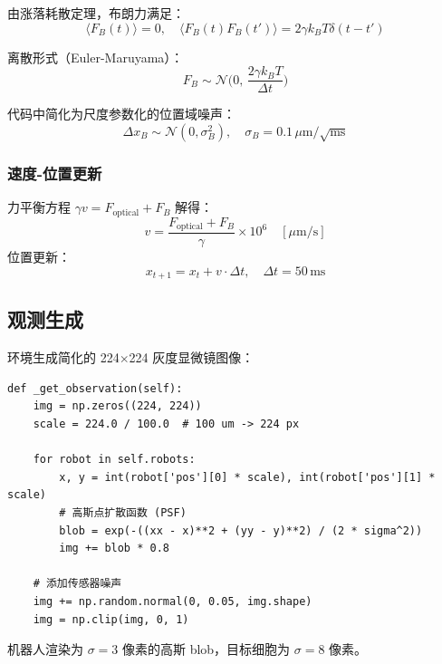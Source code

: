 \documentclass[UTF8, a4paper]{ctexart}
\begin{document}
由涨落耗散定理，布朗力满足：
\begin{equation}
\langle F_B(t) \rangle = 0, \quad \langle F_B(t) F_B(t') \rangle = 2\gamma k_B T \delta(t - t')
\end{equation}

离散形式（Euler-Maruyama）：
\begin{equation}
F_B \sim \mathcal{N}\Big(0, \, \frac{2\gamma k_B T}{\Delta t}\Big)
\end{equation}

代码中简化为尺度参数化的位置域噪声：
\begin{equation}
\Delta x_B \sim \mathcal{N}(0, \sigma_B^2), \quad \sigma_B = 0.1\,\mu\text{m}/\sqrt{\text{ms}}
\end{equation}

\subsubsection{速度-位置更新}

力平衡方程 $\gamma v = F_{\text{optical}} + F_B$ 解得：
\begin{equation}
\boxed{v = \frac{F_{\text{optical}} + F_B}{\gamma} \times 10^6 \quad [\mu\text{m}/\text{s}]}
\end{equation}
位置更新：
\begin{equation}
x_{t+1} = x_t + v \cdot \Delta t, \quad \Delta t = 50\,\text{ms}
\end{equation}

\subsection{观测生成}

环境生成简化的 224$\times$224 灰度显微镜图像：

\begin{lstlisting}
def _get_observation(self):
    img = np.zeros((224, 224))
    scale = 224.0 / 100.0  # 100 um -> 224 px
    
    for robot in self.robots:
        x, y = int(robot['pos'][0] * scale), int(robot['pos'][1] * scale)
        # 高斯点扩散函数 (PSF)
        blob = exp(-((xx - x)**2 + (yy - y)**2) / (2 * sigma^2))
        img += blob * 0.8
    
    # 添加传感器噪声
    img += np.random.normal(0, 0.05, img.shape)
    img = np.clip(img, 0, 1)
\end{lstlisting}

机器人渲染为 $\sigma = 3$ 像素的高斯 blob，目标细胞为 $\sigma = 8$ 像素。
\end{document}
